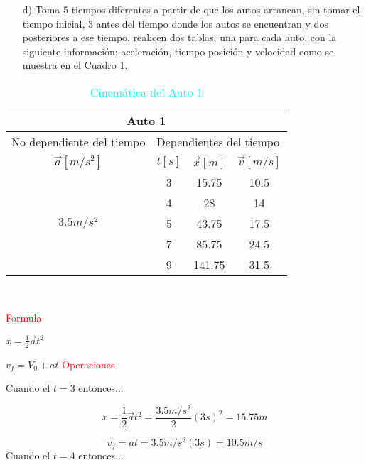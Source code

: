 \documentclass[letterpaper,12pt]{article}
\begin{document}
\begin{enumerate}
\begin {itemize}
    $\therefore$ El primer auto tienen una velocidad de 22.575m/s aproximadamete y el auto dos tienen una velocidad  de 26.705m/s aproximadamente.
     \item[d)]Toma 5 tiempos diferentes a partir de que los autos arrancan, sin tomar el tiempo inicial, 3 antes del tiempo donde los autos se encuentran y dos posteriores a ese tiempo, realicen dos tablas, una para cada auto, con la siguiente información; aceleración, tiempo posición y velocidad como se muestra en el Cuadro 1. 
  \end{itemize} 
  \begin{table}[h]
        \centering
            \begin{tabular}{|c|c|c|c|c|c|}\hline \hline
                \multicolumn{6}{|c|}{Auto 1}\\\hline
                \multicolumn{3}{|l|}{No dependiente del tiempo} & \multicolumn{3}{|l|}{Dependientes del tiempo}\\\hline
                \multicolumn{3}{|c|}{$\vec{a}[m/s^{2}]$}
                & {$t[s]$} & {$\vec{x}[m]$} & {$\vec{v}[m/s]$}\\\hline
                \multicolumn{3}{|c|}{} &3  &15.75  &10.5 \\\cline{4-6}
                \multicolumn{3}{|c|}{} &4  &28  &14 \\\cline{4-6}
                \multicolumn{3}{|c|}{$3.5m/s^{2}$} &5  &43.75  &17.5 \\\cline{4-6}
                \multicolumn{3}{|c|}{} &7  &85.75  &24.5 \\\cline{4-6}
                \multicolumn{3}{|c|}{} &9 &141.75  &31.5 \\\hline \hline
            \end{tabular}\\
        \caption{\textcolor{cyan}{Cinemática del Auto 1}}
        \label{Cuadro 1: Cinemática del Auto 1}
        \end{table}  

{\textcolor{red}{Formula}}

${x}=\frac{1}{2}\Vec{a}t^{2}$

$v_f=V_0+at$
{\textcolor{red}{Operaciones}}

Cuando el $t=3$ entonces...

$${x}=\frac{1}{2}\Vec{a}t^{2}=\frac{3.5m/s^{2}}{2}(3s)^{2}=15.75m$$

$$v_f=at=3.5m/s^{2}(3s)=10.5m/s$$
Cuando el $t=4$ entonces...


\end{enumerate}
\end{document}

